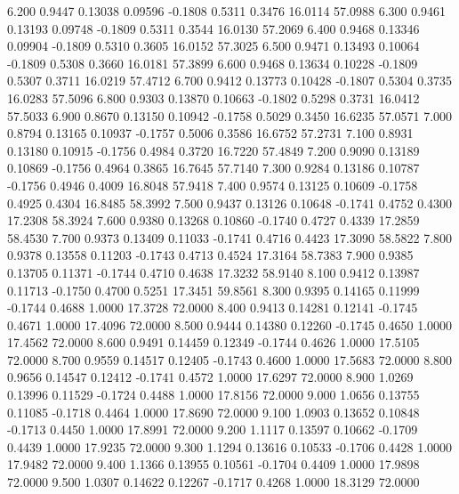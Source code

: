    6.200   0.9447   0.13038   0.09596  -0.1808   0.5311   0.3476  16.0114  57.0988
   6.300   0.9461   0.13193   0.09748  -0.1809   0.5311   0.3544  16.0130  57.2069
   6.400   0.9468   0.13346   0.09904  -0.1809   0.5310   0.3605  16.0152  57.3025
   6.500   0.9471   0.13493   0.10064  -0.1809   0.5308   0.3660  16.0181  57.3899
   6.600   0.9468   0.13634   0.10228  -0.1809   0.5307   0.3711  16.0219  57.4712
   6.700   0.9412   0.13773   0.10428  -0.1807   0.5304   0.3735  16.0283  57.5096
   6.800   0.9303   0.13870   0.10663  -0.1802   0.5298   0.3731  16.0412  57.5033
   6.900   0.8670   0.13150   0.10942  -0.1758   0.5029   0.3450  16.6235  57.0571
   7.000   0.8794   0.13165   0.10937  -0.1757   0.5006   0.3586  16.6752  57.2731
   7.100   0.8931   0.13180   0.10915  -0.1756   0.4984   0.3720  16.7220  57.4849
   7.200   0.9090   0.13189   0.10869  -0.1756   0.4964   0.3865  16.7645  57.7140
   7.300   0.9284   0.13186   0.10787  -0.1756   0.4946   0.4009  16.8048  57.9418
   7.400   0.9574   0.13125   0.10609  -0.1758   0.4925   0.4304  16.8485  58.3992
   7.500   0.9437   0.13126   0.10648  -0.1741   0.4752   0.4300  17.2308  58.3924
   7.600   0.9380   0.13268   0.10860  -0.1740   0.4727   0.4339  17.2859  58.4530
   7.700   0.9373   0.13409   0.11033  -0.1741   0.4716   0.4423  17.3090  58.5822
   7.800   0.9378   0.13558   0.11203  -0.1743   0.4713   0.4524  17.3164  58.7383
   7.900   0.9385   0.13705   0.11371  -0.1744   0.4710   0.4638  17.3232  58.9140
   8.100   0.9412   0.13987   0.11713  -0.1750   0.4700   0.5251  17.3451  59.8561
   8.300   0.9395   0.14165   0.11999  -0.1744   0.4688   1.0000  17.3728  72.0000
   8.400   0.9413   0.14281   0.12141  -0.1745   0.4671   1.0000  17.4096  72.0000
   8.500   0.9444   0.14380   0.12260  -0.1745   0.4650   1.0000  17.4562  72.0000
   8.600   0.9491   0.14459   0.12349  -0.1744   0.4626   1.0000  17.5105  72.0000
   8.700   0.9559   0.14517   0.12405  -0.1743   0.4600   1.0000  17.5683  72.0000
   8.800   0.9656   0.14547   0.12412  -0.1741   0.4572   1.0000  17.6297  72.0000
   8.900   1.0269   0.13996   0.11529  -0.1724   0.4488   1.0000  17.8156  72.0000
   9.000   1.0656   0.13755   0.11085  -0.1718   0.4464   1.0000  17.8690  72.0000
   9.100   1.0903   0.13652   0.10848  -0.1713   0.4450   1.0000  17.8991  72.0000
   9.200   1.1117   0.13597   0.10662  -0.1709   0.4439   1.0000  17.9235  72.0000
   9.300   1.1294   0.13616   0.10533  -0.1706   0.4428   1.0000  17.9482  72.0000
   9.400   1.1366   0.13955   0.10561  -0.1704   0.4409   1.0000  17.9898  72.0000
   9.500   1.0307   0.14622   0.12267  -0.1717   0.4268   1.0000  18.3129  72.0000
